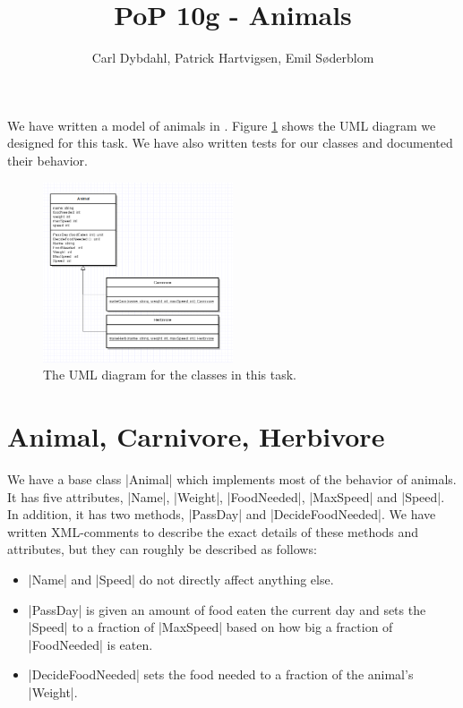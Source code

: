 \documentclass[a4paper]{article}
\title{PoP 10g - Animals}
\author{Carl Dybdahl, Patrick Hartvigsen, Emil Søderblom}
\begin{document}
\maketitle

We have written a model of animals in \Fsh. Figure \ref{uml} shows the UML diagram we designed for this task. We have also written tests for our classes and documented their behavior.

\begin{figure}[!ht]
\centering
\includegraphics[width=0.5\textwidth]{animal_uml}
\caption{The UML diagram for the classes in this task.}
\label{uml}
\end{figure}

\section{Animal, Carnivore, Herbivore}

We have a base class \code|Animal| which implements most of the behavior of animals. It has five attributes, \code|Name|, \code|Weight|, \code|FoodNeeded|, \code|MaxSpeed| and \code|Speed|. In addition, it has two methods, \code|PassDay| and \code|DecideFoodNeeded|. We have written XML-comments to describe the exact details of these methods and attributes, but they can roughly be described as follows:

\begin{itemize}
\item \code|Name| and \code|Speed| do not directly affect anything else.
\item \code|PassDay| is given an amount of food eaten the current day and sets the \code|Speed| to a fraction of \code|MaxSpeed| based on how big a fraction of \code|FoodNeeded| is eaten.
\item \code|DecideFoodNeeded| sets the food needed to a fraction of the animal's \code|Weight|.
\end{itemize}
\end{document}

